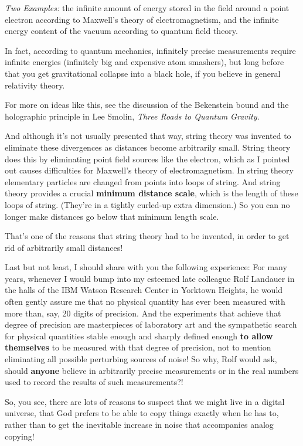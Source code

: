 \documentclass[12pt]{book}
\begin{document}
\emph{Two Examples:} the infinite amount of energy stored in the field around 
a point electron according to Maxwell's theory of electromagnetism,
and the infinite energy content of the vacuum according to quantum field theory.
 
In fact,
according to quantum mechanics, infinitely precise measurements require infinite energies (infinitely
big and expensive atom smashers), but long before that you get gravitational collapse
into a black hole, if you believe in general relativity theory.
 
For more on ideas like this, see the discussion of the 
Bekenstein bound and the holographic principle
in Lee Smolin, \emph{Three Roads to Quantum Gravity.}
 
And although it's not usually presented that way,
string theory was invented to eliminate these divergences as distances
become arbitrarily small. String theory does this by eliminating point field sources
like the electron, which as I pointed out 
causes difficulties for Maxwell's theory of electromagnetism.
In string theory elementary particles are changed from points into loops of string.
And string theory
provides a crucial \textbf{minimum distance scale}, which is the length of these loops of string.
(They're in a tightly curled-up extra dimension.)
So you can no longer make distances go below that minimum length scale.
 
That's one of the reasons that string theory had to be invented, in order to get rid of
arbitrarily small distances!
 
Last but not least, I should share with you the following experience:
For many years, whenever I would bump into my esteemed late colleague Rolf Landauer
in the halls of the IBM Watson Research Center in Yorktown Heights, he would often gently
assure me that
no physical quantity has ever been measured 
with more than, say, 20 digits of precision.
And the experiments that achieve that degree of precision are masterpieces of laboratory
art and the sympathetic search for physical quantities stable enough and sharply defined enough
\textbf{to allow themselves} to be measured with that degree of precision, not to mention eliminating
all possible perturbing sources of noise!
So why, Rolf would ask, should \textbf{anyone} believe in arbitrarily precise measurements 
or in the real numbers used to record the results of such measurements?!
 
So, you see, there are lots of reasons to suspect that we might live
in a digital universe, that God prefers to be able to copy things exactly
when he has to, rather than to get the inevitable increase in noise that
accompanies analog copying!
 
\end{document}
